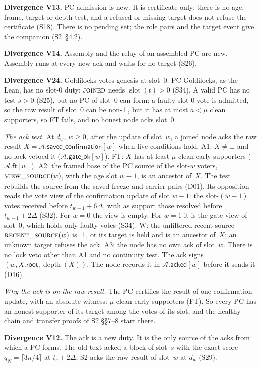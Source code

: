 \documentclass{article}
\newcommand{\slot}{\operatorname{slot}}
\newcommand{\rootf}{\mathsf{root}}
\newcommand{\AC}{\mathcal A}
\newcommand{\savedConfirmation}{\mathsf{saved\_confirmation}}
\newcommand{\acked}{\mathsf{acked}}
\newcommand{\depth}{\operatorname{depth}}
\newcommand{\PCdiv}[2]{\par\noindent\textbf{Divergence #1.} #2\par}
\begin{document}
\PCdiv{V13}{PC admission is new.  It is certificate-only: there is no age,
frame, target or depth test, and a refused or missing target does not
refuse the certificate (S18).  There is no pending set; the role pairs and
the target event give the companion (S2~\S4.2).}

\PCdiv{V14}{Assembly and the relay of an assembled PC are new.  Assembly
runs at every new ack and waits for no target (S26).}

\PCdiv{V24}{Goldilocks votes genesis at slot~$0$.  PC-Goldilocks, as the
Lean, has no slot-$0$ duty: $\Call{joined}{}$ needs $\slot(t)>0$ (S34).  A
valid PC has no test $s>0$ (S25), but no PC of slot~$0$ can form: a
faulty slot-$0$ vote is admitted, so the raw result of slot~$0$ can be
non-$\bot$, but it has at most $a<\mu$ clean supporters, so FT fails, and
no honest node acks slot~$0$.}
\emph{The ack test.}  At $d_w$, $w\geq0$, after the update of slot~$w$, a
joined node acks the raw result $X=\AC.\savedConfirmation[w]$ when five
conditions hold.  A1: $X\neq\bot$ and no lock vetoed it
($\AC.\mathsf{gate\_ok}[w]$).  FT: $X$ has at least $\mu$ clean early
supporters ($\AC.\mathsf{ft}[w]$).  A2: the framed base of the PC source of
the slot-$w$ voters, $\Call{view\_source}{}(w)$, with the age slot $w-1$,
is an ancestor of~$X$.  The test rebuilds the source from the saved freeze
and carrier pairs (D01).  Its opposition reads the vote view of the
confirmation update of slot $w-1$: the slot-$(w-1)$ votes received before
$t_{w-1}+6\Delta$, with as support those resolved before $t_{w-1}+2\Delta$
(S32).  For $w=0$ the view is empty.  For $w=1$ it is the gate view of
slot~$0$, which holds only faulty votes (S34).
W: the unfiltered recent source $\Call{recent\_source}{}(w)$ is~$\bot$, or
its target is held and is an ancestor of~$X$; an unknown target refuses the
ack.  A3: the node has no own ack of slot~$w$.  There is no lock veto other
than A1 and no continuity test.  The ack signs $(w,X.\rootf,\depth(X))$.
The node records it in $\AC.\acked[w]$ before it sends it (D16).

\emph{Why the ack is on the raw result.}  The PC certifies the result of
one confirmation update, with an absolute witness: $\mu$ clean early
supporters (FT).  So every PC has an honest supporter of its target among
the votes of its slot, and the healthy-chain and transfer proofs of S2
\S\S7--8 start there.

\PCdiv{V12}{The ack is a new duty.  It is the only source of the acks from
which a PC forms.  The old text acked a block of slot~$s$ with the exact
score $q_N=\lceil3n/4\rceil$ at $t_s+2\Delta$; S2 acks the raw result of
slot~$w$ at $d_w$ (S29).}
\end{document}

